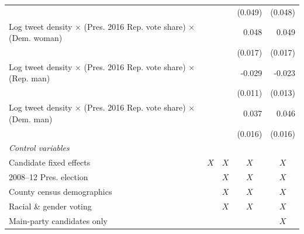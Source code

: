 \documentclass[manuscript,screen,nonacm,11pt,acm]{acmart}
\begin{document}
\begin{bibunit}
\begin{table}[ht]
\begin{adjustbox}{max width=1\textwidth}
\begin{tabular}{@{\hspace{0\tabcolsep}}l*{4}{D{.}{.}{-1}}@{\hspace{0\tabcolsep}}}
                                                  &                  &                  &  (0.049)         &  (0.048)         \\
Log tweet density $ \times $ (Pres. 2016 Rep. vote share) $ \times $ (Dem. woman)&                  &                  &    0.048\sym{***}&    0.049\sym{***}\\
                                                  &                  &                  &  (0.017)         &  (0.017)         \\
Log tweet density $ \times $ (Pres. 2016 Rep. vote share) $ \times $ (Rep. man)  &                  &                  &   -0.029\sym{***}&   -0.023\sym{*}  \\
                                                  &                  &                  &  (0.011)         &  (0.013)         \\
Log tweet density $ \times $ (Pres. 2016 Rep. vote share) $ \times $ (Dem. man)  &                  &                  &    0.037\sym{**} &    0.046\sym{***}\\
                                                  &                  &                  &  (0.016)         &  (0.016)         \\
\emph{Control variables}                          &                  &                  &                  &                  \\
\hspace{1em}Candidate fixed effects               &         &         &         &         \\
\hspace{1em}2008--12 Pres. election               &                  &         &         &         \\
\hspace{1em}County census demographics            &                  &         &         &         \\
\hspace{1em}Racial \& gender voting               &                  &         &         &         \\
Main-party candidates only                        &                  &                  &                  &         \\

\end{tabular}
\end{adjustbox}
\end{table}
\end{bibunit}
\end{document}

